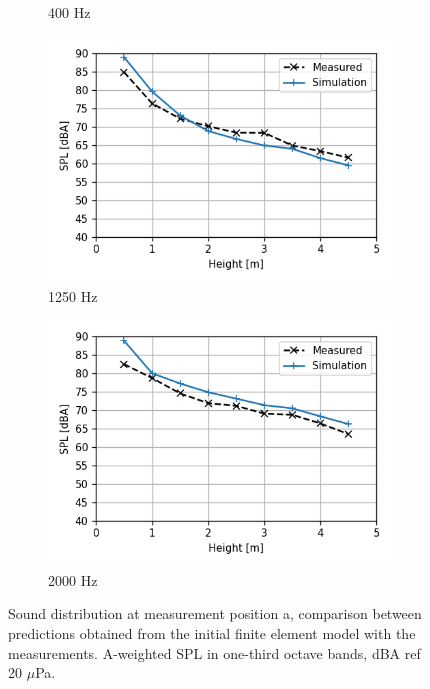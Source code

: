 \begin{figure}[H]
\begin{subfigure}[b]{0.49\textwidth}
		\caption{400 Hz}
	\end{subfigure}
	\begin{subfigure}[b]{0.49\textwidth}
		\centering
		\includegraphics[width=\textwidth]{fig/chap5/initial_model/third_octave_over_height/1250_Hz.png}
		\caption{1250 Hz}
	\end{subfigure}
	\begin{subfigure}[b]{0.49\textwidth}
		\centering
		\includegraphics[width=\textwidth]{fig/chap5/initial_model/third_octave_over_height/2000_Hz.png}
		\caption{2000 Hz}
	\end{subfigure}
	\caption{Sound distribution at measurement position a, comparison between predictions obtained from the initial finite element model with the measurements. A-weighted SPL in one-third octave bands, dBA ref 20 $\mu$Pa.}
	\label{fig:third_octave_over_height}
\end{figure}

